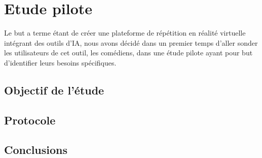 \section{Etude pilote}

Le but a terme étant de créer une plateforme de répétition en réalité virtuelle intégrant des outils d'IA, nous avons décidé dans un premier temps d'aller sonder les utilisateurs de cet outil, les comédiens, dans une étude pilote ayant pour but d'identifier leurs besoins spécifiques. 

\subsection{Objectif de l'étude}
\subsection{Protocole}
\subsection{Conclusions}


